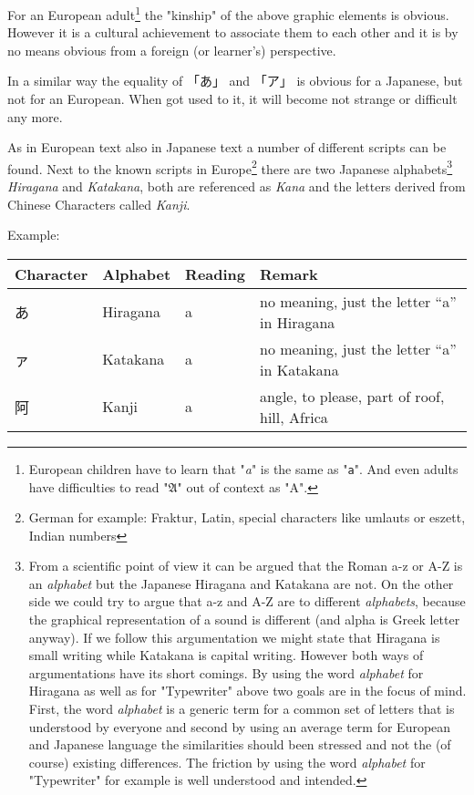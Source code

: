 For an European adult\footnote{European children have to learn that
"\textit{a}" is the same as "\texttt{a}". And even adults have difficulties to
read "$\mathfrak{A}$" out of context as "A".}  the "kinship" of the above
graphic elements is obvious. However it is a cultural achievement to associate
them to each other and it is by no means obvious from a foreign (or learner's)
perspective. 

In a similar way the equality of {「あ」} and {「ア」} is obvious for a
Japanese, but not for an European. When got used to it, it will become not
strange or difficult any more.

As in European text also in Japanese text a number of different scripts can be
found. Next to the known scripts in Europe\footnote{German for example:
Fraktur, Latin, special characters like umlauts or eszett, Indian numbers}
there are two Japanese alphabets\footnote{ From a scientific point of view it
can be argued that the Roman a-z or A-Z is an \textit{alphabet} but the
Japanese Hiragana and Katakana are not. On the other side we could try to argue
that a-z and A-Z are to different \textit{alphabets}, because the graphical
representation of a sound is different (and alpha is Greek letter anyway). If
we follow this argumentation we might state that Hiragana is small writing
while Katakana is capital writing. However both ways of argumentations have its
short comings. By using the word \textit{alphabet} for Hiragana as well as for
"Typewriter" above two goals are in the focus of mind. First, the word
\textit{alphabet} is a generic term for a common set of letters that is
understood by everyone and second by using an average term for European and
Japanese language the similarities should been stressed and not the (of course)
existing differences. The friction by using the word \textit{alphabet} for
"Typewriter" for example is well understood and intended. } \textit{Hiragana}
and \textit{Katakana}, both are referenced as \textit{Kana} and the letters
derived from Chinese Characters called \textit{Kanji}.


Example:

\begin{center}
\begin{tabular}{|l|l|l|l|}
\textbf{Character}&\textbf{Alphabet}&\textbf{Reading}&\textbf{Remark}\\\hline
あ& Hiragana & a & no meaning, just the letter  ``a'' in Hiragana \\
ァ& Katakana & a & no meaning, just the letter ``a'' in Katakana \\
阿& Kanji    & a & { angle, to please, part of roof, hill, Africa}\\
\end{tabular}
\end{center}


